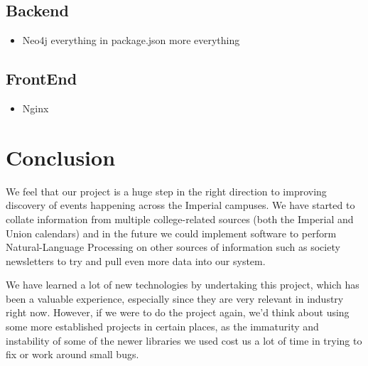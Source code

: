 \documentclass[11pt]{article}
\begin{document}
\subsection{Backend}
\begin{itemize}
\item Neo4j
	\subitem everything in package.json
	\subitem more everything
\end{itemize}
\subsection{FrontEnd}
\begin{itemize}
	\item Nginx
\end{itemize}

\section {Conclusion}
We feel that our project is a huge step in the right direction to improving discovery of events happening across the Imperial campuses. We have started to collate information from multiple college-related sources (both the Imperial and Union calendars) and in the future we could implement software to perform Natural-Language Processing on other sources of information such as society newsletters to try and pull even more data into our system.

We have learned a lot of new technologies by undertaking this project, which has been a valuable experience, especially since they are very relevant in industry right now. However, if we were to do the project again, we'd think about using some more established projects in certain places, as the immaturity and instability of some of the newer libraries we used cost us a lot of time in trying to fix or work around small bugs.


\newpage

\theendnotes
\end{document}
